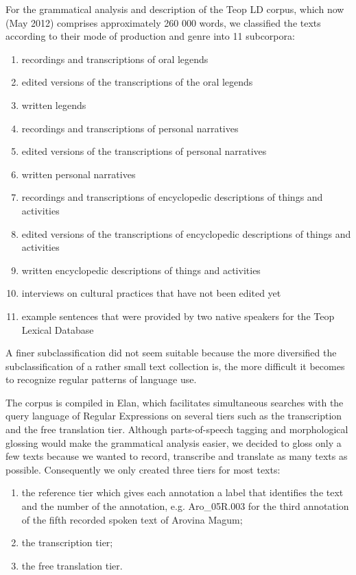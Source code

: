 For the grammatical analysis and description of the Teop LD corpus, which now (May 2012) comprises approximately 260 000 words, we classified the texts according to their mode of production and genre into 11 subcorpora: 

\begin{enumerate}
\item recordings and transcriptions of oral legends 
\item edited versions of the transcriptions of the oral legends
\item written legends
\item recordings and transcriptions of personal narratives
\item edited versions of the transcriptions of personal narratives
\item written personal narratives
\item recordings and transcriptions of encyclopedic descriptions of things and activities
\item edited versions of the transcriptions of encyclopedic descriptions of things and activities
\item written encyclopedic descriptions of things and activities
\item  interviews on cultural practices that have not been edited yet
\item   example sentences that were provided by two native speakers for the Teop Lexical Database

\end{enumerate}

A finer subclassification did not seem suitable because the more diversified the subclassification of a rather small text collection is, the more difficult it becomes to recognize regular patterns of language use.


The corpus is compiled in Elan, which facilitates simultaneous searches with the query language of Regular Expressions on several tiers such as the transcription and the free translation tier. Although parts-of-speech tagging and morphological glossing would make the grammatical analysis easier, we decided to gloss only a few texts because we wanted to record, transcribe and translate as many texts as possible. Consequently we only created three tiers for most texts:

\begin{enumerate}
\item {the reference tier which gives each annotation a label that identifies the text and the number of the annotation, e.g. Aro\_05R.003 for the third annotation of the fifth recorded spoken text of Arovina Magum;}
\item {the transcription tier;}
\item {the free translation tier.}
\end{enumerate}


